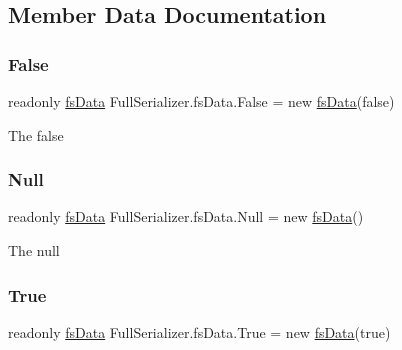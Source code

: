 \subsection{Member Data Documentation}
\mbox{\label{class_full_serializer_1_1fs_data_a55dbf6381c50c95a042334c119fccdfc}} 
\subsubsection{\texorpdfstring{False}{False}}
{\footnotesize\ttfamily readonly \hyperlink{class_full_serializer_1_1fs_data}{fs\+Data} Full\+Serializer.\+fs\+Data.\+False = new \hyperlink{class_full_serializer_1_1fs_data}{fs\+Data}(false)\hspace{0.3cm}{\ttfamily [static]}}



The false 

\mbox{\label{class_full_serializer_1_1fs_data_adcb3ce2b86c6f317a74ee3ecfe9c41be}} 
\subsubsection{\texorpdfstring{Null}{Null}}
{\footnotesize\ttfamily readonly \hyperlink{class_full_serializer_1_1fs_data}{fs\+Data} Full\+Serializer.\+fs\+Data.\+Null = new \hyperlink{class_full_serializer_1_1fs_data}{fs\+Data}()\hspace{0.3cm}{\ttfamily [static]}}



The null 

\mbox{\label{class_full_serializer_1_1fs_data_af36a1f41bbcf0f17e56b77cc80e0e0b3}} 
\subsubsection{\texorpdfstring{True}{True}}
{\footnotesize\ttfamily readonly \hyperlink{class_full_serializer_1_1fs_data}{fs\+Data} Full\+Serializer.\+fs\+Data.\+True = new \hyperlink{class_full_serializer_1_1fs_data}{fs\+Data}(true)\hspace{0.3cm}{\ttfamily [static]}}



